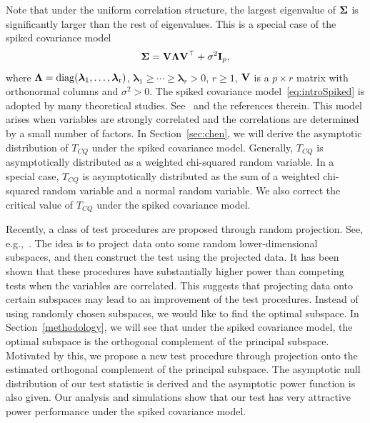 \documentclass[times,sort&compress,3p]{elsarticle}
\newcommand{\mydiag}{\rm diag}
\newcommand{\bfsym}[1]{\ensuremath{\boldsymbol{#1}}}
\def\blambda {\bfsym {\lambda}}        \def\bLambda {\bfsym {\Lambda}}
\theoremstyle{plain}
\theoremstyle{definition}
\theoremstyle{remark}
\begin{document}
  Note that under the uniform correlation structure, the largest eigenvalue of $\bSigma$ is significantly larger than the rest of eigenvalues.
  This is a special case of the spiked covariance model
 \begin{equation}\label{eq:introSpiked}
 \bSigma =\BV\bLambda \BV^\top  +\sigma^2 \BI_p,
 \end{equation}
 where $\bLambda=\mydiag(\blambda_1,\ldots,\blambda_r)$, $\blambda_1\geq \cdots\geq \blambda_r>0$, $r\geq 1$, $\mathbf{V}$ is a $p\times r$ matrix with orthonormal columns and $\sigma^2>0$.
The spiked covariance model~\eqref{eq:introSpiked} is adopted by many theoretical studies. See~\cite{Birnbaum2013,Cai2012Sparse,Passemier2015} and the references therein.
This model arises when variables are strongly correlated and the correlations are determined by a small number of factors.
 In Section~\ref{sec:chen}, we will derive the asymptotic distribution of $T_{CQ}$ under the spiked covariance model. 
Generally, $T_{CQ}$ is asymptotically distributed as a weighted chi-squared random variable.
In a special case, $T_{CQ}$ is asymptotically distributed as the sum of a weighted chi-squared random variable and a normal random variable. 
We also correct the critical value of $T_{CQ}$ under the spiked covariance model.

Recently, a class of test procedures are proposed through random projection.
See, e.g.,~\cite{Lopes2015A,Thulin2014A,Srivastava2014RAPTT}.
The idea is to project data onto some random lower-dimensional subspaces, and then construct the test using the projected data.
It has been shown that these procedures have substantially higher power than competing tests when the variables are correlated. 
This suggests that projecting data onto certain subspaces may lead to an improvement of the test procedures.
Instead of using randomly chosen subspaces, we would like to find the optimal subspace.
In Section~\ref{methodology}, we will see that under the spiked covariance model, the optimal subspace is the orthogonal complement of the principal subspace.
Motivated by this, we propose a new test procedure through projection onto the estimated orthogonal complement of the principal subspace.  
The asymptotic null distribution of our test statistic is derived and the asymptotic power function is also given.
Our analysis and simulations show that our test has very attractive power performance under the spiked covariance model.
\end{document}
